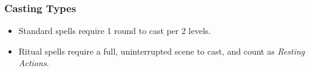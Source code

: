 \begin{multicols}{2}
\begin{itemize}
\end{itemize}

\subsubsection{Casting Types}

\begin{itemize}

  \item
  Standard spells require 1 round to cast per 2 levels.
  \item
  Ritual spells require a full, uninterrupted scene to cast, and count as \textit{Resting Actions}.

\end{itemize}

\end{multicols}
